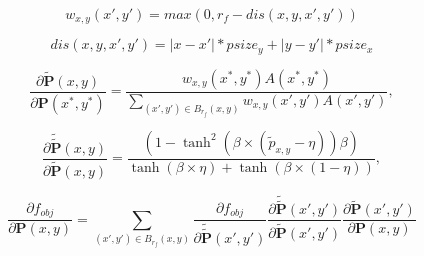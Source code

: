 \begin{equation}
  w_{x, y}(x', y') = max(0, r_f - dis(x, y, x', y'))
  \label{eq:hatbased}
\end{equation}

\begin{equation}
  dis(x, y, x', y') = |x-x'|*psize_y+|y-y'|*psize_x
  \label{eq:distance}
\end{equation}

\begin{equation}
  \frac{\partial\widetilde{\boldsymbol{P}}(x, y)}{\partial \boldsymbol{P}(x^{*}, y^{*})} = \frac{w_{x, y}(x^{*},
  y^{*})A(x^{*}, y^{*})}
  {\displaystyle\sum_{(x', y') \in B_{r_f}(x, y)} w_{x, y}(x', y') A(x', y')},
  \label{eq:densityfiltergrad}
\end{equation}

\begin{equation}
  \frac{\partial\widetilde{\widetilde{\boldsymbol{P}}}(x, y)}{\partial \widetilde{\boldsymbol{P}}(x, y)} =
  \frac{(1 - \tanh^2 (\beta \times (\widetilde{p}_{x, y} - \eta)) \beta)}
       {\tanh (\beta \times \eta) + \tanh (\beta \times (1 - \eta))},
  \label{eq:projecition-grad}
\end{equation}

\begin{equation}
  \frac{\partial f_{obj}}{\partial \boldsymbol{P}(x, y)} = \displaystyle\sum_{(x', y') \in B_{r_f}(x, y)}
  \frac{\partial f_{obj}}{\partial \widetilde{\widetilde{\boldsymbol{P}}}(x', y')}
  \frac{\partial \widetilde{\widetilde{\boldsymbol{P}}}(x', y')}{\partial \widetilde{\boldsymbol{P}}(x', y')}
   \frac{\partial \widetilde{\boldsymbol{P}}(x', y')}{\partial \boldsymbol{P}(x, y)}
  \label{eq:fobjgrad}
\end{equation}






